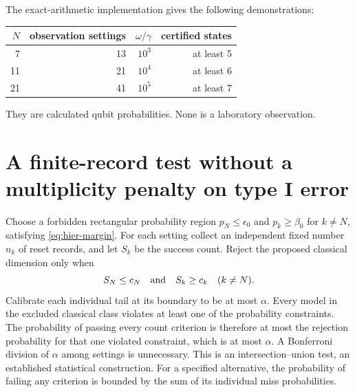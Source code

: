 The exact-arithmetic implementation gives the following demonstrations:
\begin{center}
\begin{tabular}{rrrr}
$N$ & observation settings & $\omega/\gamma$ & certified states\\
\hline
7 & 13 & $10^3$ & at least 5\\
11 & 21 & $10^4$ & at least 6\\
21 & 41 & $10^5$ & at least 7
\end{tabular}
\end{center}
They are calculated qubit probabilities. None is a laboratory observation.

\section{A finite-record test without a multiplicity penalty on type I error}
Choose a forbidden rectangular probability region
$p_N\le\epsilon_0$ and $p_k\ge\beta_0$ for $k\ne N$, satisfying
\eqref{eq:hier-margin}. For each setting collect an independent fixed number
$n_k$ of reset records, and let $S_k$ be the success count. Reject the proposed
classical dimension only when
\begin{equation}
 S_N\le c_N\quad\hbox{and}\quad S_k\ge c_k\quad(k\ne N).
                                                        \label{eq:hier-test}
\end{equation}
Calibrate each individual tail at its boundary to be at most $\alpha$.
Every model in the excluded classical class violates at least one of the
probability constraints. The probability of passing every count criterion is
therefore at most the rejection probability for that one violated constraint,
which is at most $\alpha$. A Bonferroni division of $\alpha$ among settings is
unnecessary. This is an intersection--union test, an established statistical
construction. For a specified alternative, the probability of failing any
criterion is bounded by the sum of its individual miss probabilities.

